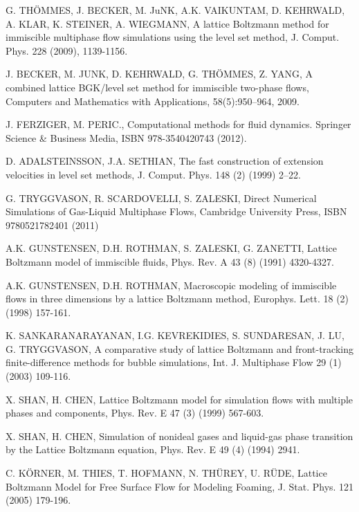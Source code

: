 \documentclass[final,leqno,onefignum,onetabnum]{siamltexmm}
\begin{document}
\begin{thebibliography}{1}	

 {\sc G. TH\"OMMES, J. BECKER, M. JuNK, A.K. VAIKUNTAM, D. KEHRWALD, A. KLAR, K. STEINER, A. WIEGMANN}, A lattice Boltzmann method for immiscible multiphase flow simulations using the level set method, J. Comput. Phys. 228 (2009), 1139-1156.

 {\sc J. BECKER, M. JUNK, D. KEHRWALD, G. TH\"OMMES, Z. YANG}, A combined lattice BGK/level set method for immiscible two-phase flows, Computers and Mathematics with Applications, 58(5):950–964, 2009.

 {\sc J. FERZIGER, M. PERIC.}, Computational methods for fluid dynamics. Springer Science \& Business Media, ISBN 978-3540420743 (2012).

 {\sc D. ADALSTEINSSON, J.A. SETHIAN}, The fast construction of extension velocities in level set methods, J. Comput. Phys. 148 (2) (1999) 2–22.

 {\sc G. TRYGGVASON, R. SCARDOVELLI, S. ZALESKI}, Direct Numerical Simulations of Gas-Liquid Multiphase Flows, Cambridge University Press, ISBN 9780521782401 (2011)

 {\sc A.K. GUNSTENSEN, D.H. ROTHMAN, S. ZALESKI, G. ZANETTI}, Lattice Boltzmann model of immiscible fluids, Phys. Rev. A 43 (8) (1991) 4320-4327.

 {\sc A.K. GUNSTENSEN, D.H. ROTHMAN}, Macroscopic modeling of immiscible flows in three dimensions by a lattice Boltzmann method, Europhys. Lett. 18 (2) (1998) 157-161.
	
 {\sc K. SANKARANARAYANAN, I.G. KEVREKIDIES, S. SUNDARESAN, J. LU, G. TRYGGVASON}, A comparative study of lattice Boltzmann and front-tracking finite-difference methods for bubble simulations, Int. J. Multiphase Flow 29 (1) (2003) 109-116.

 {\sc X. SHAN, H. CHEN}, Lattice Boltzmann model for simulation flows with multiple phases and components, Phys. Rev. E 47 (3) (1999) 567-603.

 {\sc X. SHAN, H. CHEN}, Simulation of nonideal gases and liquid-gas phase transition by the Lattice Boltzmann equation, Phys. Rev. E 49 (4) (1994) 2941.
	
 {\sc C. K\"ORNER, M. THIES, T. HOFMANN, N. TH\"UREY, U. R\"UDE}, Lattice Boltzmann Model for Free Surface Flow for Modeling Foaming, J. Stat. Phys. 121 (2005) 179-196.


\end{thebibliography}
\end{document}
